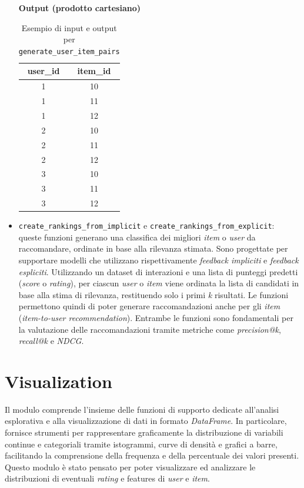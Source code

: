 \begin{itemize}
\begin{table}[H]
        \begin{minipage}{\textwidth}
            \centering
            \textbf{Output (prodotto cartesiano)}\\[0.5em]
            \begin{tabular}{|c|c|}
            \hline
            \textbf{user\_id} & \textbf{item\_id} \\
            \hline
            1 & 10 \\
            1 & 11 \\
            1 & 12 \\
            2 & 10 \\
            2 & 11 \\
            2 & 12 \\
            3 & 10 \\
            3 & 11 \\
            3 & 12 \\
            \hline
            \end{tabular}
        \end{minipage}
        \caption{Esempio di input e output per \texttt{generate\_user\_item\_pairs}}
    \end{table}
    \item \texttt{create\_rankings\_from\_implicit} e \texttt{create\_rankings\_from\_explicit}: \\ queste funzioni generano una classifica dei migliori \textit{item} o \textit{user} da raccomandare, ordinate in base alla rilevanza stimata. Sono progettate per supportare modelli che utilizzano rispettivamente \textit{feedback impliciti} e \textit{feedback espliciti}. Utilizzando un dataset di interazioni e una lista di punteggi predetti (\textit{score} o \textit{rating}), per ciascun \textit{user} o \textit{item} viene ordinata la lista di candidati in base alla stima di rilevanza, restituendo solo i primi \textit{k} risultati. Le funzioni permettono quindi di poter generare raccomandazioni anche per gli \textit{item} (\textit{item-to-user recommendation}). Entrambe le funzioni sono fondamentali per la valutazione delle raccomandazioni tramite metriche come \textit{precision@k}, \textit{recall@k} e \textit{NDCG}.

\end{itemize}

\section{Visualization}
Il modulo comprende l'insieme delle funzioni di supporto dedicate all'analisi esplorativa e alla visualizzazione di dati in formato \textit{DataFrame}. In particolare, fornisce strumenti per rappresentare graficamente la distribuzione di variabili continue e categoriali tramite istogrammi, curve di densità e grafici a barre, facilitando la comprensione della frequenza e della percentuale dei valori presenti. Questo modulo è stato pensato per poter visualizzare ed analizzare le distribuzioni di eventuali \textit{rating} e features di \textit{user} e \textit{item}.


